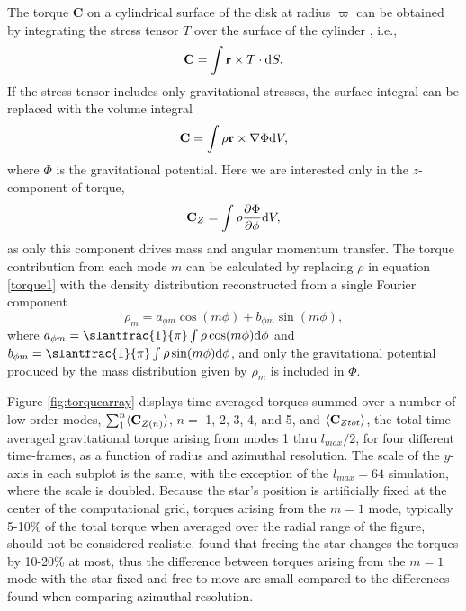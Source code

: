 \documentclass[manuscript]{aastex}
\begin{document}
The torque {\bf C} on a cylindrical surface of the disk at radius $\varpi$ can be obtained by integrating the stress tensor $T$ over the surface of the cylinder \citep{lyndenbell1972}, i.e.,
\begin{equation}
{\rm {\bf C}} = \int {\bf r} \times T \cdot {\rm d}S.
\end{equation}
If the stress tensor includes only gravitational stresses, the surface integral can be replaced with the volume integral
\begin{equation}
{\rm \bf C} = \int \rho {\bf r} \times \nabla \Phi {\rm d}V,
\end{equation}
where $\Phi$ is the gravitational potential.  Here we are interested only in the $z$-component of torque,  
\begin{equation}
\label{torque1}
{\rm \bf C}_Z = \int \rho \frac{\partial\Phi} {\partial \phi} {\rm d}V,
\end{equation}
as only this component drives mass and angular momentum transfer. The torque contribution from each mode $m$ can be calculated by replacing $\rho$ in equation \eqref{torque1} with the density distribution reconstructed from a single Fourier component
\begin{equation}
\rho_m = a_{\phi m} \cos(m\phi) + b_{\phi m} \sin(m\phi),
\end{equation}
where $a_{\phi m} =\slantfrac{1}{\pi} \int \rho \cos(m\phi){\rm d}\phi$ and $b_{\phi m} =\slantfrac{1}{\pi} \int \rho \sin(m\phi){\rm d}\phi$, and only the gravitational potential produced by the mass distribution given by $\rho_m$ is included in $\Phi$.

Figure \ref{fig:torquearray} displays 
 time-averaged torques summed over a number of low-order modes, $\sum_1^n \langle {\rm \bf C}_{Z(n)} \rangle$, $n = $ 1, 2, 3, 4, and 5, and $\langle {\rm \bf C}_{Ztot} \rangle$,
the total time-averaged gravitational torque arising from modes 1 thru $l_{max}/2$, for four different time-frames,
as a function of radius and azimuthal resolution. 
The scale of the $y$-axis in each subplot is the same, with the exception of the $l_{max} = 64$ simulation, 
where the scale is doubled.  
Because the star's position is artificially fixed at the center of the computational grid, 
torques arising from the $m=1$ mode,
typically 5-10\% of the total torque when averaged over the radial range of the figure,
should not be considered realistic.  
\citet{michael2010} found that freeing the star changes the torques by 10-20\% at most, 
thus the difference between torques arising from the $m=1$ mode with the star fixed and free to move are small compared to the differences found when comparing azimuthal resolution.
\end{document}
